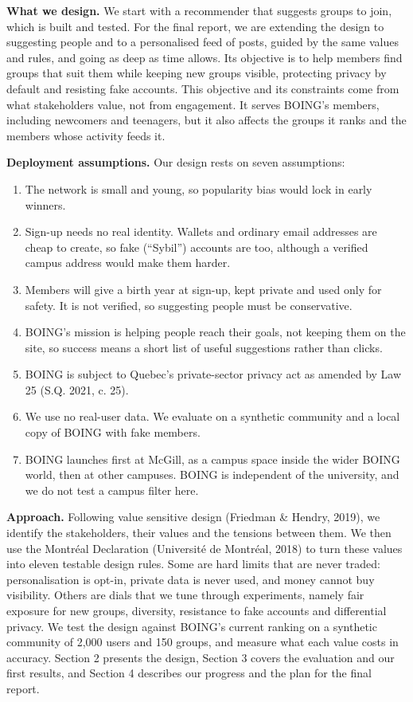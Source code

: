 \documentclass[11pt,letterpaper]{article}
\begin{document}
\textbf{What we design.} We start with a recommender that suggests groups to join, which is built and tested.
For the final report, we are extending the design to suggesting people and to a personalised feed of posts,
guided by the same values and rules, and going as deep as time allows. Its objective is to help members find
groups that suit them while keeping new groups visible, protecting privacy by default and resisting fake
accounts. This objective and its constraints come from what stakeholders value, not from engagement. It serves
BOING's members, including newcomers and teenagers, but it also affects the groups it ranks and the members
whose activity feeds it.

\textbf{Deployment assumptions.} Our design rests on seven assumptions:

\begin{enumerate}
\item The network is small and young, so popularity bias would lock in early winners.
\item Sign-up needs no real identity. Wallets and ordinary email addresses are cheap to create, so fake
(``Sybil'') accounts are too, although a verified campus address would make them harder.
\item Members will give a birth year at sign-up, kept private and used only for safety. It is not verified, so
suggesting people must be conservative.
\item BOING's mission is helping people reach their goals, not keeping them on the site, so success means a
short list of useful suggestions rather than clicks.
\item BOING is subject to Quebec's private-sector privacy act as amended by Law 25 (S.Q. 2021, c. 25).
\item We use no real-user data. We evaluate on a synthetic community and a local copy of BOING with fake
members.
\item BOING launches first at McGill, as a campus space inside the wider BOING world, then at other campuses.
BOING is independent of the university, and we do not test a campus filter here.
\end{enumerate}

\textbf{Approach.} Following value sensitive design (Friedman \& Hendry, 2019), we identify the stakeholders,
their values and the tensions between them. We then use the Montréal Declaration (Université de Montréal,
2018) to turn these values into eleven testable design rules. Some are hard limits that are never traded:
personalisation is opt-in, private data is never used, and money cannot buy visibility. Others are dials that
we tune through experiments, namely fair exposure for new groups, diversity, resistance to fake accounts and
differential privacy. We test the design against BOING's current ranking on a synthetic community of 2,000
users and 150 groups, and measure what each value costs in accuracy. Section 2 presents the design, Section 3
covers the evaluation and our first results, and Section 4 describes our progress and the plan for the final
report.
\end{document}
